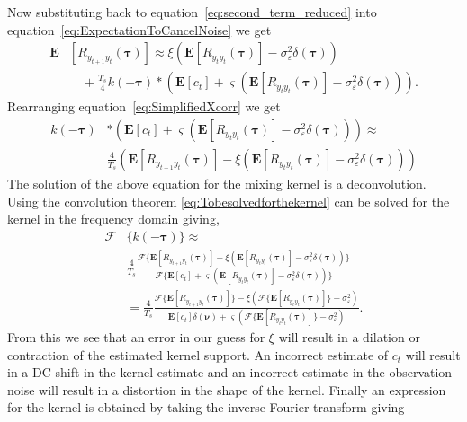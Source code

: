 \documentclass[10pt,twocolumn,twoside]{IEEEtran}
\begin{document}
Now substituting back to equation~\ref{eq:second_term_reduced} into equation~\ref{eq:ExpectationToCancelNoise}  we get
\begin{align}\label{eq:SimplifiedXcorr}
	\mathbf{E}&[R_{y_{t+1}y_t}(\boldsymbol{\tau})] \approx \xi\left(\mathbf{E}[ R_{y_ty_t}(\boldsymbol{\tau})] - \sigma_{\varepsilon}^2 \delta(\boldsymbol{\tau})\right) \nonumber \\
	&\quad+ \frac{T_s}{4} k(-\boldsymbol\tau) \ast (\mathbf{E}\left[c_t\right] + \varsigma (\mathbf{E}\left[R_{y_ty_t}(\boldsymbol\tau)\right] - \sigma_{\varepsilon}^2 \delta(\boldsymbol\tau))).
\end{align}
Rearranging equation~\ref{eq:SimplifiedXcorr} we get
\begin{align} \label{eq:Tobesolvedforthekernel}
	k(-\boldsymbol\tau) & \ast (\mathbf{E}\left[c_t\right] + \varsigma (\mathbf{E}\left[R_{y_ty_t}(\boldsymbol\tau)\right] - \sigma_{\varepsilon}^2 \delta(\boldsymbol\tau))) \approx  \nonumber \\
	& \frac{4}{T_s}(\mathbf{E}[R_{y_{t+1}y_t}(\boldsymbol{\tau})] - \xi\left(\mathbf{E}[ R_{y_ty_t}(\boldsymbol{\tau})] - \sigma_{\varepsilon}^2 \delta(\boldsymbol{\tau})\right))
\end{align}
The solution of the above equation for the mixing kernel is a deconvolution. Using the convolution theorem \eqref{eq:Tobesolvedforthekernel} can be solved for the kernel in the frequency domain giving,
\begin{align}
	\mathcal{F}&\{k(-\boldsymbol\tau)\} \approx  \nonumber \\
	&\frac{4}{T_s} \frac{\mathcal{F}\{\mathbf{E}[R_{y_{t+1}y_t}(\boldsymbol{\tau})] - \xi\left(\mathbf{E}[ R_{y_ty_t}(\boldsymbol{\tau})] - \sigma_{\varepsilon}^2 \delta(\boldsymbol{\tau})\right)\}}{\mathcal{F}\{\mathbf{E}\left[c_t\right] + \varsigma (\mathbf{E}\left[R_{y_ty_t}(\boldsymbol\tau)\right] - \sigma_{\varepsilon}^2 \delta(\boldsymbol\tau))\}} \nonumber \\
	&= \frac{4}{T_s} \frac{\mathcal{F}\{\mathbf{E}[R_{y_{t+1}y_t}(\boldsymbol{\tau})]\} - \xi\left(\mathcal{F}\{\mathbf{E}[ R_{y_ty_t}(\boldsymbol{\tau})]\} - \sigma_{\varepsilon}^2 \right)} {\mathbf{E}\left[c_t\right]\delta(\boldsymbol{\nu}) + \varsigma (\mathcal{F}\{\mathbf{E}\left[R_{y_ty_t}(\boldsymbol\tau)\right]\} - \sigma_{\varepsilon}^2 )}.  \label{eq:Fourier_TF_of_Kernel}
\end{align} 
From this we see that an error in our guess for $\xi$ will result in a dilation or contraction of the estimated kernel support. An incorrect estimate of $c_t$ will result in a DC shift in the kernel estimate and an incorrect estimate in the observation noise will result in a distortion in the shape of the kernel. Finally an expression for the kernel is obtained by taking the inverse Fourier transform giving
\end{document}
